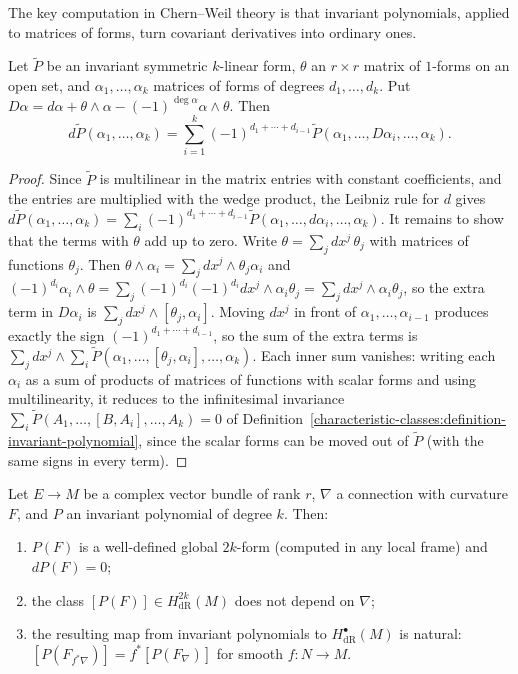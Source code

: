 The key computation in Chern--Weil theory is that invariant polynomials, applied to matrices of forms, turn covariant derivatives into ordinary ones.

\begin{lemma}\label{characteristic-classes:lemma-invariant-derivative}
Let $\tilde P$ be an invariant symmetric $k$-linear form, $\theta$ an $r \times r$ matrix of $1$-forms on an open set, and $\alpha_1, \ldots, \alpha_k$ matrices of forms of degrees
$d_1, \ldots, d_k$. Put $D\alpha = d\alpha + \theta \wedge \alpha - (-1)^{\deg\alpha}\alpha \wedge \theta$. Then
\[
d\tilde P(\alpha_1, \ldots, \alpha_k) = \sum_{i=1}^k(-1)^{d_1 + \cdots + d_{i-1}}\tilde P(\alpha_1, \ldots, D\alpha_i, \ldots, \alpha_k).
\]
\end{lemma}

\begin{proof}
Since $\tilde P$ is multilinear in the matrix entries with constant coefficients, and the entries are multiplied with the wedge product, the Leibniz rule for $d$ gives
$d\tilde P(\alpha_1, \ldots, \alpha_k) = \sum_i(-1)^{d_1 + \cdots + d_{i-1}}\tilde P(\alpha_1, \ldots, d\alpha_i, \ldots, \alpha_k)$. It remains to show that the terms with $\theta$ add up to zero.
Write $\theta = \sum_jdx^j\,\theta_j$ with matrices of functions $\theta_j$. Then $\theta \wedge \alpha_i = \sum_jdx^j \wedge \theta_j\alpha_i$ and
$(-1)^{d_i}\alpha_i \wedge \theta = \sum_j(-1)^{d_i}(-1)^{d_i}dx^j \wedge \alpha_i\theta_j = \sum_jdx^j \wedge \alpha_i\theta_j$, so the extra term in $D\alpha_i$ is $\sum_jdx^j \wedge [\theta_j, \alpha_i]$. Moving
$dx^j$ in front of $\alpha_1, \ldots, \alpha_{i-1}$ produces exactly the sign $(-1)^{d_1 + \cdots + d_{i-1}}$, so the sum of the extra terms is
$\sum_jdx^j \wedge \sum_i\tilde P(\alpha_1, \ldots, [\theta_j, \alpha_i], \ldots, \alpha_k)$. Each inner sum vanishes: writing each $\alpha_i$ as a sum of products of matrices of functions with
scalar forms and using multilinearity, it reduces to the infinitesimal invariance $\sum_i\tilde P(A_1, \ldots, [B, A_i], \ldots, A_k) = 0$ of
Definition~\ref{characteristic-classes:definition-invariant-polynomial}, since the scalar forms can be moved out of $\tilde P$ (with the same signs in every term).
\end{proof}

\begin{theorem}\label{characteristic-classes:theorem-chern-weil}
Let $E \to M$ be a complex vector bundle of rank $r$, $\nabla$ a connection with curvature $F$, and $P$ an invariant polynomial of degree $k$. Then:
\begin{enumerate}
\item $P(F)$ is a well-defined global $2k$-form (computed in any local frame) and $dP(F) = 0$;
\item the class $[P(F)] \in H^{2k}_{\mathrm{dR}}(M)$ does not depend on $\nabla$;
\item the resulting map from invariant polynomials to $H^\bullet_{\mathrm{dR}}(M)$ is natural: $[P(F_{f^*\nabla})] = f^*[P(F_\nabla)]$ for smooth $f \colon N \to M$.
\end{enumerate}
\end{theorem}

